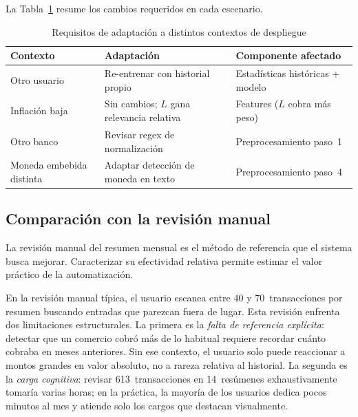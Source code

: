 \documentclass[conference]{IEEEtran}
\begin{document}
La Tabla~\ref{tab:transferability} resume los cambios requeridos en cada escenario.

\begin{table}[h]
\caption{Requisitos de adaptaci\'on a distintos contextos de despliegue}
\label{tab:transferability}
\centering
\begin{tabular}{p{1.7cm}p{2.4cm}p{2.6cm}}
\toprule
\textbf{Contexto} & \textbf{Adaptaci\'on} & \textbf{Componente afectado} \\
\midrule
Otro usuario         & Re-entrenar con historial propio         & Estad\'isticas hist\'oricas + modelo \\
\addlinespace
Inflaci\'on baja     & Sin cambios; $L$ gana relevancia relativa & Features ($L$ cobra m\'as peso) \\
\addlinespace
Otro banco           & Revisar regex de normalizaci\'on          & Preprocesamiento paso~1 \\
\addlinespace
Moneda embebida distinta & Adaptar detecci\'on de moneda en texto  & Preprocesamiento paso~4 \\
\bottomrule
\end{tabular}
\end{table}

\subsection{Comparaci\'on con la revisi\'on manual}

La revisi\'on manual del resumen mensual es el m\'etodo de referencia que el
sistema busca mejorar. Caracterizar su efectividad relativa permite estimar el
valor pr\'actico de la automatizaci\'on.

En la revisi\'on manual t\'ipica, el usuario escanea entre 40 y 70~transacciones
por resumen buscando entradas que parezcan fuera de lugar. Esta revisi\'on enfrenta
dos limitaciones estructurales. La primera es la \emph{falta de referencia
expl\'icita}: detectar que un comercio cobr\'o m\'as de lo habitual requiere recordar
cu\'anto cobraba en meses anteriores. Sin ese contexto, el usuario solo puede
reaccionar a montos grandes en valor absoluto, no a rareza relativa al historial. La
segunda es la \emph{carga cognitiva}: revisar 613~transacciones en 14~res\'umenes
exhaustivamente tomar\'ia varias horas; en la pr\'actica, la mayor\'ia de los
usuarios dedica pocos minutos al mes y atiende solo los cargos que destacan
visualmente.
\end{document}
